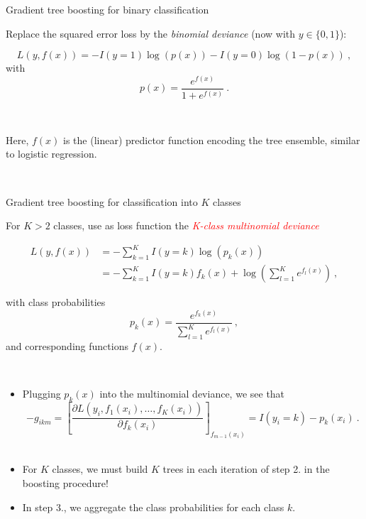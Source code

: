 \documentclass[
  10pt,
  ignorenonframetext,
]{beamer}
\providecommand{\tightlist}{%
  \setlength{\itemsep}{0pt}\setlength{\parskip}{0pt}}
\begin{document}
\begin{frame}
\begin{block}{Gradient tree boosting for binary classification}
\protect\hypertarget{gradient-tree-boosting-for-binary-classification}{}
\(~\)

Replace the squared error loss by the \emph{binomial deviance} (now with
\(y\in \{0,1\}\)):

\[L(y,f(x)) = -I(y=1) \log(p(x)) - I(y=0) \log(1-p(x)) \ , \] with
\[p(x) = \frac{e^{f(x)}}{1+e^{f(x)}} \ .\]

\(~\)

Here, \(f(x)\) is the (linear) predictor function encoding the tree
ensemble, similar to logistic regression.

\(~\)
\end{block}
\end{frame}

\begin{frame}
\begin{block}{Gradient tree boosting for classification into \(K\)
classes}
\protect\hypertarget{gradient-tree-boosting-for-classification-into-k-classes}{}
\(~\)

For \(K>2\) classes, use as loss function the
\emph{\textcolor{red}{K-class multinomial deviance}}

\begin{align}
L(y,f(x)) &= -\sum_{k=1}^K I(y = k) \log (p_k(x)) \\ 
 & = -\sum_{k=1}^K I(y = k) f_k(x) + \log(\sum_{l=1}^K e^{f_l(x)}) \ ,
 \end{align}

with class probabilities
\[p_k(x) = \frac{e^{f_k(x)}}{\sum_{l=1}^K e^{f_l(x)}} \ , \] and
corresponding functions \(f(x)\).
\end{block}
\end{frame}

\begin{frame}
\(~\)

\begin{itemize}
\item
  Plugging \(p_k(x)\) into the multinomial deviance, we see that\\
  \[-g_{ikm} = \left[ \frac{\partial L(y_i, f_1(x_i),\ldots, f_K(x_i))}{\partial f_k(x_i)} \right]_{f_{m-1}(x_i)} = I(y_i =k) - p_k(x_i) \ .\]
  \(~\)
\item
  For \(K\) classes, we must build \(K\) trees in each iteration of step
  2. in the boosting procedure!
\end{itemize}

\vspace{2mm}

\begin{itemize}
\tightlist
\item
  In step 3., we aggregate the class probabilities for each class \(k\).
\end{itemize}
\end{frame}
\end{document}

